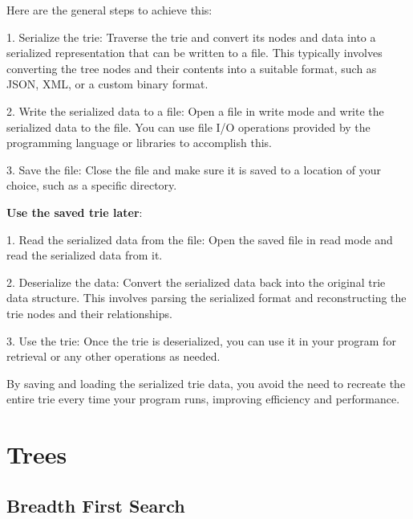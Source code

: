 Here are the general steps to achieve this:

1. Serialize the trie: Traverse the trie and convert its nodes and data
into a serialized representation that can be written to a file.
This typically involves converting the tree nodes and their contents into
a suitable format, such as JSON, XML, or a custom binary format.

2. Write the serialized data to a file:
Open a file in write mode and write the serialized data to the file.
You can use file I/O operations provided by the programming language or libraries to accomplish this.

3. Save the file: Close the file and make sure it is saved to a location of your choice,
such as a specific directory.

\textbf{Use the saved trie later}:

1. Read the serialized data from the file:
Open the saved file in read mode and read the serialized data from it.

2. Deserialize the data: Convert the serialized data back into the original trie data structure.
This involves parsing the serialized format and reconstructing the trie nodes and their relationships.

3. Use the trie: Once the trie is deserialized,
you can use it in your program for retrieval or any other operations as needed.

By saving and loading the serialized trie data,
you avoid the need to recreate the entire trie every time your program runs,
improving efficiency and performance.


\section{Trees}

\subsection{Breadth First Search}

